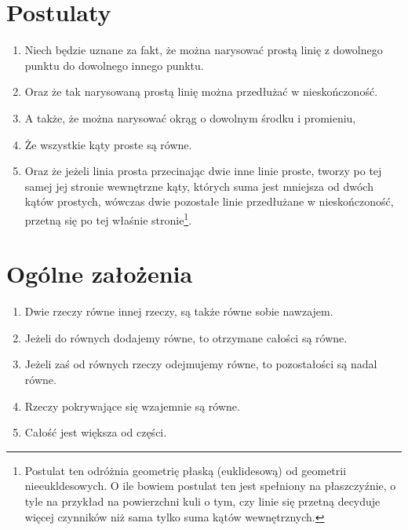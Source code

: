 \documentclass[12pt, a4paper]{scrartcl}
\begin{document}
\section*{Postulaty}

\begin{enumerate}
    \itemsep0em
    \item \mkpost
        Niech będzie uznane za fakt, że można narysować prostą linię z
        dowolnego punktu do dowolnego innego punktu.
    \item \mkpost
        Oraz że tak narysowaną prostą linię można przedłużać w nieskończoność.\
    \item \mkpost
        A także, że można narysować okrąg o dowolnym środku i promieniu,
    \item \mkpost Że wszystkie kąty proste są równe.
    \item \mkpost Oraz że jeżeli linia prosta przecinając dwie inne linie proste,
        tworzy po tej samej jej stronie wewnętrzne kąty, których suma jest
        mniejsza od dwóch kątów prostych, wówczas dwie pozostałe linie
        przedłużane w nieskończoność, przetną się po tej właśnie
        stronie\footnote{
            Postulat ten odróżnia geometrię płaską (euklidesową) od geometrii
            nieeukldesowych. O ile bowiem postulat ten jest spełniony na
            płaszczyźnie, o tyle na przykład na powierzchni kuli o tym, czy
            linie się przetną decyduje więcej czynników niż sama tylko suma
            kątów wewnętrznych.
        }.
\end{enumerate}

\begin{figure}[!h]
    \begin{center}
    \end{center}
\end{figure}

\section*{Ogólne założenia}

\begin{enumerate}
    \itemsep0em
    \item \mkcommon Dwie rzeczy równe innej rzeczy, są także równe sobie nawzajem.
    \item \mkcommon Jeżeli do równych dodajemy równe, to otrzymane całości są równe.
    \item \mkcommon
        Jeżeli zaś od równych rzeczy odejmujemy równe, to pozostałości są nadal
        równe.
    \item \mkcommon Rzeczy pokrywające się wzajemnie są równe.
    \item \mkcommon Całość jest większa od części.
\end{enumerate}
\end{document}
